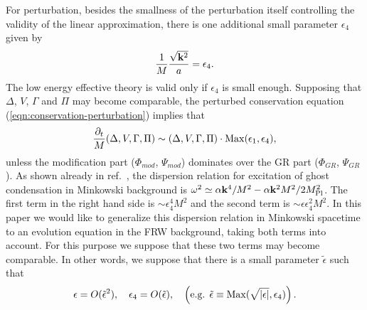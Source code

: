 For perturbation, besides the smallness of the perturbation itself
controlling the validity of the linear approximation, there is one
additional small parameter $\epsilon_4$ given by  
%
\begin{equation}
 \frac{1}{M}\frac{\sqrt{{\bf k}^2}}{a} = \epsilon_4. 
\end{equation}
The low energy effective theory is valid only if $\epsilon_4$ is small
enough. Supposing that $\Delta$, $V$, $\Gamma$ and $\Pi$ may become
comparable, the perturbed conservation equation
(\ref{eqn:conservation-perturbation}) implies that
%
\begin{equation}
 \frac{\partial_t}{M}(\Delta,V,\Gamma,\Pi)
  \sim (\Delta,V,\Gamma,\Pi) \cdot
  {\rm Max}(\epsilon_1,\epsilon_4),
\end{equation}
unless the modification part ($\Phi_{mod}$, $\Psi_{mod}$) dominates over
the GR part ($\Phi_{GR}$, $\Psi_{GR}$). As shown already in
ref.~\cite{Arkani-Hamed:2003uy}, the dispersion relation for excitation
of ghost condensation in Minkowski background is 
$\omega^2\simeq 
\alpha {\bf k}^4/M^2 -\alpha{\bf k}^2M^2/2M_{\rm Pl}^2$. 
The first term in the right hand side is $\sim \epsilon_4^4M^2$ and the
second term is $\sim \epsilon\epsilon_4^2M^2$. 
In this paper we would like to generalize this dispersion relation in
Minkowski spacetime to an evolution equation in the FRW background,
taking both terms into account. For this purpose we suppose that these
two terms may become comparable. In other words, we suppose that there
is a small parameter $\tilde{\epsilon}$ such that
%
\begin{equation}
 \epsilon = O(\tilde{\epsilon}^2), \quad
  \epsilon_4 = O(\tilde{\epsilon}), \quad
  \left(\mbox{e.g. }
   \tilde{\epsilon} \equiv {\rm Max}
   (\sqrt{|\epsilon|},\epsilon_4)
  \right).
\end{equation}



